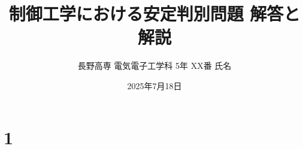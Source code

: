\documentclass[11pt,a4paper]{ltjsarticle}
\begin{document}
\title{制御工学における安定判別問題 解答と解説}
\author{長野高専 電気電子工学科 5年 XX番 氏名}
\date{2025年7月18日}
\maketitle
\thispagestyle{fancy}






\section{1}
\end{document}
